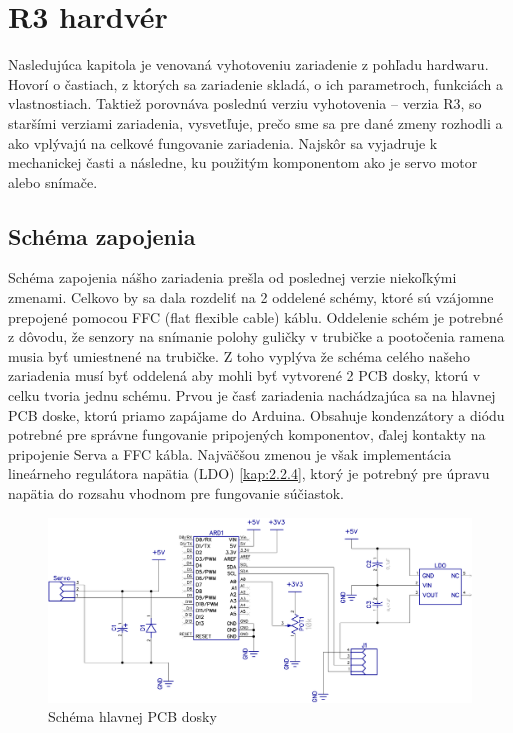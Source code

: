 \chapter{R3 hardvér}
\label{kap:2}
Nasledujúca kapitola je venovaná vyhotoveniu zariadenie z pohľadu hardwaru. Hovorí o častiach, z ktorých sa zariadenie skladá, o ich parametroch, funkciách a vlastnostiach. Taktiež porovnáva poslednú verziu vyhotovenia – verzia R3, so staršími verziami zariadenia, vysvetľuje, prečo sme sa pre dané zmeny rozhodli a ako vplývajú na celkové fungovanie zariadenia. Najskôr sa vyjadruje k mechanickej časti a následne, ku použitým komponentom ako je servo motor alebo snímače. 

\section{Schéma zapojenia}
\label{kap:2.1}

Schéma zapojenia nášho zariadenia prešla od poslednej verzie niekoľkými zmenami. Celkovo by sa dala rozdeliť na 2 oddelené schémy, ktoré sú vzájomne prepojené pomocou FFC (flat flexible cable) káblu. Oddelenie schém je potrebné z dôvodu, že senzory na snímanie polohy guličky v trubičke a pootočenia ramena musia byť umiestnené na trubičke. Z toho vyplýva že schéma celého našeho zariadenia musí byť oddelená aby mohli byť vytvorené 2 PCB dosky, ktorú v celku tvoria jednu schému. Prvou je časť zariadenia nachádzajúca sa na hlavnej PCB doske, ktorú priamo zapájame do Arduina. Obsahuje kondenzátory a diódu potrebné pre správne fungovanie pripojených komponentov, ďalej kontakty na pripojenie Serva a FFC kábla. Najväčšou zmenou je však implementácia lineárneho regulátora napätia (LDO) \ref{kap:2.2.4}, ktorý je potrebný pre úpravu napätia do rozsahu vhodnom pre fungovanie súčiastok.
\begin{figure}[!h]
	\centering
	\includegraphics[width=150mm]{obr/BoBshield.png}
	\caption{Schéma hlavnej PCB dosky}\label{OBRAZOK 2.1.1} 
\end{figure} 

